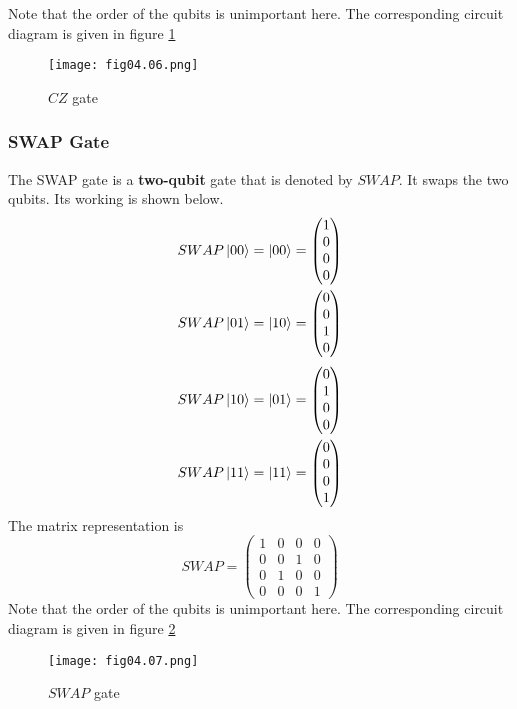 Note that the order of the qubits is unimportant here. The corresponding circuit diagram is given in figure \ref{Fig:4.6}
\begin{figure}[!htb]
   \begin{minipage}{\textwidth}
     \centering
     \texttt{[image: fig04.06.png]}
     \caption{$CZ$ gate}
     \label{Fig:4.6}
   \end{minipage}
\end{figure}

\subsubsection*{SWAP Gate}
The SWAP gate is a \textbf{two-qubit} gate that is denoted by $SWAP$. It swaps the two qubits. Its working is shown below.
\begin{equation*}
\begin{split}
SWAP\left\vert 00\right\rangle&=\left\vert 00\right\rangle=
\begin{pmatrix}
1\\
0\\
0\\
0
\end{pmatrix}\\
SWAP\left\vert 01\right\rangle&=\left\vert 10\right\rangle=
\begin{pmatrix}
0\\
0\\
1\\
0
\end{pmatrix}
\end{split}
\end{equation*}
\begin{equation*}
\begin{split}
SWAP\left\vert 10\right\rangle&=\left\vert 01\right\rangle=
\begin{pmatrix}
0\\
1\\
0\\
0
\end{pmatrix}\\
SWAP\left\vert 11\right\rangle&=\left\vert 11\right\rangle=
\begin{pmatrix}
0\\
0\\
0\\
1
\end{pmatrix}\\
\end{split}
\end{equation*}
The matrix representation is
\begin{equation*}
SWAP=
\begin{pmatrix}
1&0&0&0\\
0&0&1&0\\
0&1&0&0\\
0&0&0&1
\end{pmatrix}
\end{equation*}
Note that the order of the qubits is unimportant here. The corresponding circuit diagram is given in figure \ref{Fig:4.7}
\begin{figure}[!htb]
   \begin{minipage}{\textwidth}
     \centering
     \texttt{[image: fig04.07.png]}
     \caption{$SWAP$ gate}
     \label{Fig:4.7}
   \end{minipage}
\end{figure}

